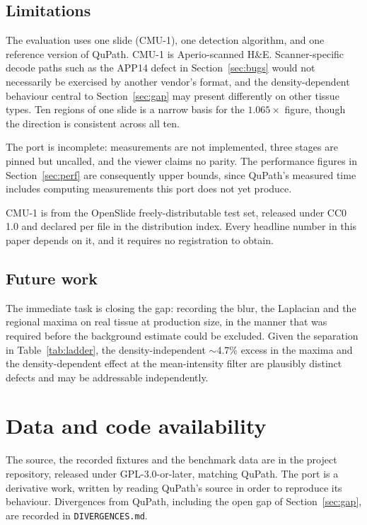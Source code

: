 \documentclass[11pt,a4paper]{article}
\begin{document}
\subsection{Limitations}

The evaluation uses one slide (CMU-1), one detection algorithm, and one
reference version of QuPath. CMU-1 is Aperio-scanned H\&E. Scanner-specific
decode paths such as the APP14 defect in Section~\ref{sec:bugs} would not
necessarily be exercised by another vendor's format, and the density-dependent
behaviour central to Section~\ref{sec:gap} may present differently on other
tissue types. Ten regions of one slide is a narrow basis for the $1.065\times$
figure, though the direction is consistent across all ten.

The port is incomplete: measurements are not implemented, three stages are
pinned but uncalled, and the viewer claims no parity. The performance figures in
Section~\ref{sec:perf} are consequently upper bounds, since QuPath's measured
time includes computing measurements this port does not yet produce.

CMU-1 is from the OpenSlide freely-distributable test set, released under
CC0 1.0 and declared per file in the distribution index. Every headline number
in this paper depends on it, and it requires no registration to obtain.

\subsection{Future work}

The immediate task is closing the gap: recording the blur, the Laplacian and the
regional maxima on real tissue at production size, in the manner that was
required before the background estimate could be excluded. Given the separation
in Table~\ref{tab:ladder}, the density-independent $\sim$4.7\% excess in the
maxima and the density-dependent effect at the mean-intensity filter are
plausibly distinct defects and may be addressable independently.

\section*{Data and code availability}

The source, the recorded fixtures and the benchmark data are in the project
repository, released under GPL-3.0-or-later, matching QuPath. The port is a
derivative work, written by reading QuPath's source in order to reproduce its
behaviour. Divergences from QuPath, including the open gap of
Section~\ref{sec:gap}, are recorded in \texttt{DIVERGENCES.md}.
\end{document}
